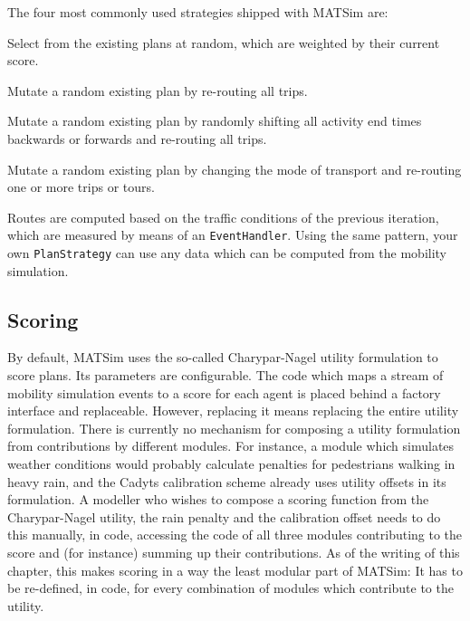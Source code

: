 The four most commonly used strategies shipped with MATSim are:

\begin{compactitem}
\item Select from the existing plans at random, which are weighted by their current score.
\item Mutate a random existing plan by re-routing all trips.
\item Mutate a random existing plan by randomly shifting all activity end times backwards or forwards and re-routing 
all trips.
\item Mutate a random existing plan by changing the mode of transport and re-routing one or more trips or tours.
\end{compactitem}

Routes are computed based on the traffic conditions of the previous iteration, which are measured
by means of an \lstinline$EventHandler$. Using the same pattern, your own \lstinline$PlanStrategy$ can use any data which
can be computed from the mobility simulation.

\subsection{Scoring}
By default, MATSim uses the so-called Charypar-Nagel utility formulation to score plans. Its parameters
are configurable.
The code which maps a stream of mobility simulation events to a score for each agent is placed behind a factory
 interface and replaceable. However, replacing it means replacing the entire utility formulation. There is
 currently no mechanism for composing a utility formulation from contributions by different modules.
For instance, a module which simulates weather conditions would probably calculate penalties for pedestrians
  walking in heavy rain, and the Cadyts calibration scheme already uses utility offsets in its formulation. A modeller
  who wishes to compose a scoring function from the Charypar-Nagel utility, the rain penalty and the calibration offset
  needs to do this manually, in code, accessing the code of all three modules contributing to the score and (for instance) summing
  up their contributions. As of the writing of this chapter, this makes scoring in a way the least modular part of MATSim: It has to 
be re-defined, in code, for every combination of modules which contribute to the utility.

